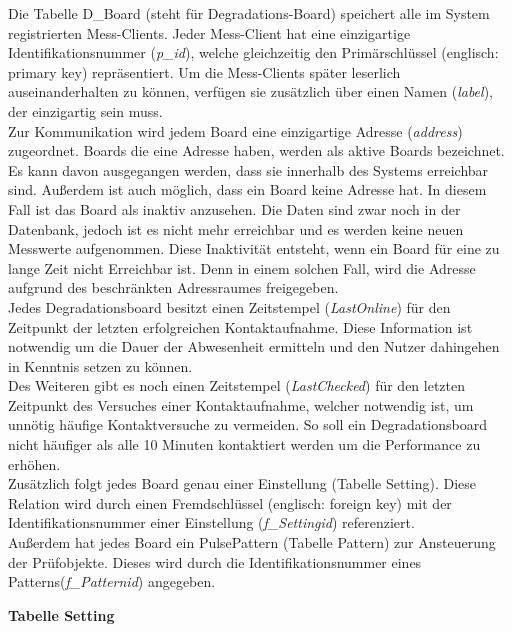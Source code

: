 Die Tabelle D\_Board (steht für Degradations-Board) speichert alle im System registrierten Mess-Clients. Jeder Mess-Client hat eine einzigartige Identifikationsnummer (\textit{p\_id}), welche gleichzeitig den Primärschlüssel (englisch: primary key) repräsentiert. Um die Mess-Clients später leserlich auseinanderhalten zu können, verfügen sie zusätzlich über einen Namen (\textit{label}), der einzigartig sein muss.\\
Zur Kommunikation wird jedem Board eine einzigartige Adresse (\textit{address}) zugeordnet. Boards die eine Adresse haben, werden als aktive Boards bezeichnet. Es kann davon ausgegangen werden, dass sie innerhalb des Systems erreichbar sind. Außerdem ist auch möglich, dass ein Board keine Adresse hat. In diesem Fall ist das Board als inaktiv anzusehen. Die Daten sind zwar noch in der Datenbank, jedoch ist es nicht mehr erreichbar und es werden keine neuen Messwerte aufgenommen. Diese Inaktivität entsteht, wenn ein Board für eine zu lange Zeit nicht Erreichbar ist. Denn in einem solchen Fall, wird die Adresse aufgrund des beschränkten Adressraumes freigegeben.\\
Jedes Degradationsboard besitzt einen Zeitstempel (\textit{LastOnline}) für den Zeitpunkt der letzten erfolgreichen Kontaktaufnahme. Diese Information ist notwendig um die Dauer der Abwesenheit ermitteln und den Nutzer dahingehen in Kenntnis setzen zu können.\\
Des Weiteren gibt es noch einen Zeitstempel (\textit{LastChecked}) für den letzten Zeitpunkt des Versuches einer Kontaktaufnahme, welcher notwendig ist, um unnötig häufige Kontaktversuche zu vermeiden. So soll ein Degradationsboard nicht häufiger als alle 10 Minuten kontaktiert werden um die Performance zu erhöhen.\\
Zusätzlich folgt jedes Board genau einer Einstellung (Tabelle Setting). Diese Relation wird durch einen Fremdschlüssel (englisch: foreign key) mit der Identifikationsnummer einer Einstellung (\textit{f\_Settingid}) referenziert.\\
Außerdem hat jedes Board ein PulsePattern (Tabelle Pattern) zur Ansteuerung der Prüfobjekte. Dieses wird durch die Identifikationsnummer eines Patterns(\textit{f\_Patternid}) angegeben.


\newpage

\textbf{Tabelle Setting}\\

